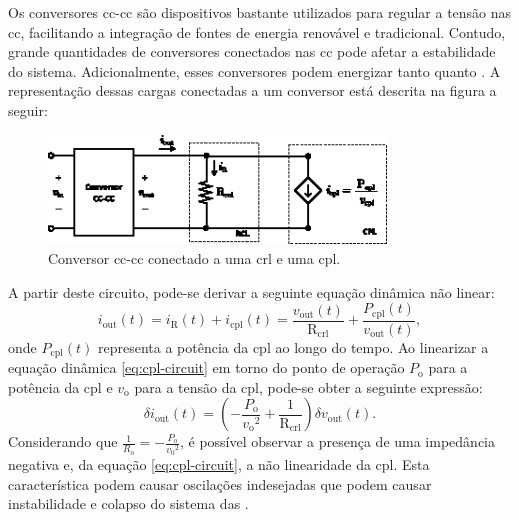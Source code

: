 Os conversores \acrshort{cc}-\acrshort{cc} são dispositivos bastante utilizados para regular a tensão nas  \acrshort{cc}, facilitando a integração de fontes de energia renovável e tradicional. Contudo, grande quantidades de conversores conectados nas  \acrshort{cc} pode afetar a estabilidade do sistema. Adicionalmente, esses conversores podem energizar tanto  quanto . A representação dessas cargas conectadas a um conversor está descrita na figura a seguir:

\begin{figure}[H]
  \centering
  \includegraphics[width=0.80\textwidth]{figuras/cpl_circuit.eps}
  \caption{Conversor \acrshort{cc}-\acrshort{cc} conectado a uma \acrshort{crl} e uma \acrshort{cpl}.}
  \label{fig:cpl_circuit}
\end{figure}

\noindent A partir deste circuito, pode-se derivar a seguinte equação dinâmica não linear: \begin{equation} i_{\mathrm{out}}(t) = i_{\mathrm{R}}(t) + i_{\mathrm{cpl}}(t) = \frac{v_{\mathrm{out}}(t)}{\mathrm{R_{crl}}} + \frac{{P_{\mathrm{cpl}}(t)}}{v_{\mathrm{out}}(t)} \label{eq:cpl-circuit},\end{equation} onde $P_{\mathrm{cpl}}(t)$ representa a potência da \acrshort{cpl} ao longo do tempo. Ao linearizar a equação dinâmica \eqref{eq:cpl-circuit} em torno do ponto de operação $P_{\mathrm{o}}$ para a potência da \acrshort{cpl} e $v_{\mathrm{o}}$ para a tensão da \acrshort{cpl}, pode-se obter a seguinte expressão: \begin{equation} \delta i_{\mathrm{out}}(t) = \left(- \frac{P_{\mathrm{o}}}{{v_{\mathrm{o}}}^2} + \frac{1}{\mathrm{R_{crl}}} \right) \delta v_{\mathrm{out}}(t). \end{equation} Considerando que $ \displaystyle \frac{1}{R_{\mathrm{o}}} = - \frac{P_{\mathrm{o}}}{{v_0}^2}$, é possível observar a presença de uma impedância negativa e, da equação \eqref{eq:cpl-circuit}, a não linearidade da \acrshort{cpl}. Esta característica podem causar oscilações indesejadas que podem causar instabilidade e colapso do sistema das  \citep{Bessa2020, Amiri2020}.

